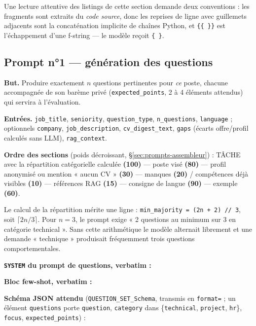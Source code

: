 Une lecture attentive des listings de cette section demande deux conventions :
les fragments sont extraits du \emph{code source}, donc les reprises de ligne
avec guillemets adjacents sont la concaténation implicite de chaînes Python, et
\verb|{{ }}| est l'échappement d'une f-string --- le modèle reçoit
\verb|{ }|.

\subsection{Prompt n°1 --- génération des questions}
\label{sec:prompt-questions}

\textbf{But.} Produire exactement $n$ questions pertinentes pour \emph{ce}
poste, chacune accompagnée de son barème privé (\texttt{expected\_points},
2 à 4 éléments attendus) qui servira à l'évaluation.

\textbf{Entrées.} \texttt{job\_title}, \texttt{seniority},
\texttt{question\_type}, \texttt{n\_questions}, \texttt{language} ; optionnels
\texttt{company}, \texttt{job\_description}, \texttt{cv\_digest\_text},
\texttt{gaps} (écarts offre/profil calculés sans LLM), \texttt{rag\_context}.

\textbf{Ordre des sections} (poids décroissant, §\ref{sec:prompts-assembleur}) :
TÂCHE avec la répartition catégorielle calculée \textbf{(100)} --- poste visé
\textbf{(80)} --- profil anonymisé ou mention « aucun CV » \textbf{(30)} ---
manques \textbf{(20)} / compétences déjà visibles \textbf{(10)} --- références
RAG \textbf{(15)} --- consigne de langue \textbf{(90)} --- exemple
\textbf{(60)}.

Le calcul de la répartition mérite une ligne : \texttt{min\_majority =
(2n + 2) // 3}, soit $\lceil 2n/3 \rceil$. Pour $n=3$, le prompt exige
« 2 questions au minimum sur 3 en catégorie technical ». Sans cette arithmétique
le modèle alternait librement et une demande « technique » produisait
fréquemment trois questions comportementales.

\textbf{\texttt{SYSTEM} du prompt de questions, verbatim :}


\textbf{Bloc few-shot, verbatim :}


\textbf{Schéma JSON attendu} (\texttt{QUESTION\_SET\_Schema}, transmis en
\texttt{format=} ; un élément \texttt{questions} porte \texttt{question},
\texttt{category} dans \{\texttt{technical}, \texttt{project}, \texttt{hr}\},
\texttt{focus}, \texttt{expected\_points}) :


